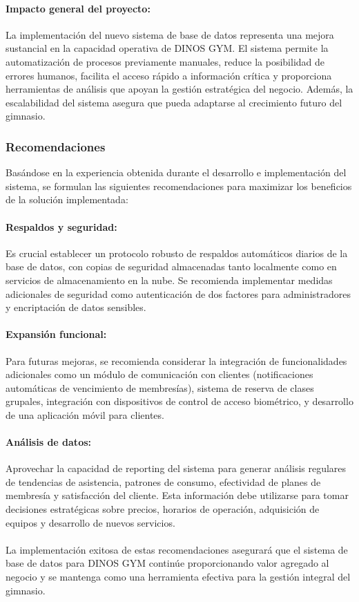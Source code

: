 \documentclass[12pt, letterpaper]{article}
\begin{document}
\paragraph{Impacto general del proyecto:}
La implementación del nuevo sistema de base de datos representa una mejora sustancial en la capacidad operativa de DINOS GYM. El sistema permite la automatización de procesos previamente manuales, reduce la posibilidad de errores humanos, facilita el acceso rápido a información crítica y proporciona herramientas de análisis que apoyan la gestión estratégica del negocio. Además, la escalabilidad del sistema asegura que pueda adaptarse al crecimiento futuro del gimnasio.

\subsubsection{Recomendaciones}
Basándose en la experiencia obtenida durante el desarrollo e implementación del sistema, se formulan las siguientes recomendaciones para maximizar los beneficios de la solución implementada:\\
\paragraph{Respaldos y seguridad:}
Es crucial establecer un protocolo robusto de respaldos automáticos diarios de la base de datos, con copias de seguridad almacenadas tanto localmente como en servicios de almacenamiento en la nube. Se recomienda implementar medidas adicionales de seguridad como autenticación de dos factores para administradores y encriptación de datos sensibles.\\
\paragraph{Expansión funcional:}
Para futuras mejoras, se recomienda considerar la integración de funcionalidades adicionales como un módulo de comunicación con clientes (notificaciones automáticas de vencimiento de membresías), sistema de reserva de clases grupales, integración con dispositivos de control de acceso biométrico, y desarrollo de una aplicación móvil para clientes.\\
\paragraph{Análisis de datos:}
Aprovechar la capacidad de reporting del sistema para generar análisis regulares de tendencias de asistencia, patrones de consumo, efectividad de planes de membresía y satisfacción del cliente. Esta información debe utilizarse para tomar decisiones estratégicas sobre precios, horarios de operación, adquisición de equipos y desarrollo de nuevos servicios.\\ \\
La implementación exitosa de estas recomendaciones asegurará que el sistema de base de datos para DINOS GYM continúe proporcionando valor agregado al negocio y se mantenga como una herramienta efectiva para la gestión integral del gimnasio.
\newpage
\end{document}
